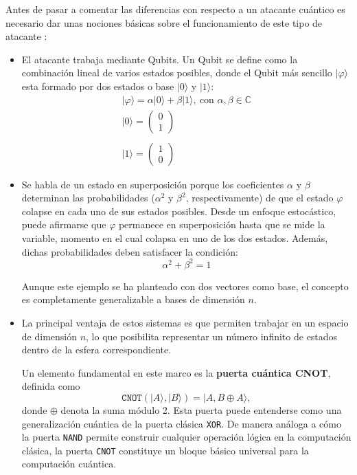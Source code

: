 Antes de pasar a comentar las diferencias con respecto a un atacante cuántico es necesario dar unas nociones básicas sobre el funcionamiento de este tipo de atacante \cite{Nielsen_Chuang_2010}:
\begin{itemize}
	\item El atacante trabaja mediante Qubits. Un Qubit se define como la combinación lineal de varios estados posibles, donde el Qubit más sencillo $|\varphi \rangle$ esta formado por dos estados o base $|0\rangle$ y $|1\rangle$:
	\begin{equation}
		\begin{array}{l}
			|\varphi\rangle=\alpha|0\rangle+\beta|1\rangle, \ \text{con } \alpha, \beta \in \mathbb{C}\\
			|0\rangle=\begin{pmatrix}
				0\\
				1
			\end{pmatrix}\\\\
			|1\rangle=\begin{pmatrix}
				1\\
				0
			\end{pmatrix}
		\end{array}
	\end{equation}
	\item Se habla de un estado en superposición porque los coeficientes $\alpha$ y $\beta$ determinan las probabilidades (\(\alpha^2\) y \(\beta^2\), respectivamente) de que el estado $\varphi$ colapse en cada uno de sus estados posibles. Desde un enfoque estocástico, puede afirmarse que $\varphi$ permanece en superposición hasta que se mide la variable, momento en el cual colapsa en uno de los dos estados. Además, dichas probabilidades deben satisfacer la condición:
	\begin{equation}
		\alpha^2 + \beta^2 = 1
	\end{equation}
	
	Aunque este ejemplo se ha planteado con dos vectores como base, el concepto es completamente generalizable a bases de dimensión \(n\). 
	\item La principal ventaja de estos sistemas es que permiten trabajar en un espacio de dimensión \(n\), lo que posibilita representar un número infinito de estados dentro de la esfera correspondiente.
	\newline
	
	Un elemento fundamental en este marco es la \textbf{puerta cuántica CNOT}, definida como
	\begin{equation}
	\texttt{CNOT}(|A\rangle,|B\rangle)=|A, B \oplus A\rangle ,
	\end{equation}
	donde \(\oplus\) denota la suma módulo 2. Esta puerta puede entenderse como una generalización cuántica de la puerta clásica \texttt{XOR}. De manera análoga a cómo la puerta \texttt{NAND} permite construir cualquier operación lógica en la computación clásica, la puerta \texttt{CNOT} constituye un bloque básico universal para la computación cuántica.
\end{itemize}

